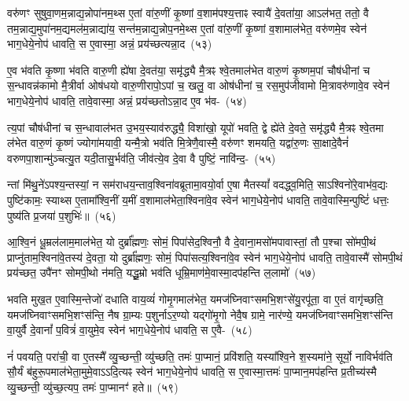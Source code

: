 {\anuvakamend[शृ॒णाति॑ मिथु॒नाना᳚न्नयति यच्छति॥]}

वरु॑णꣳ सुषुवा॒णम॒न्नाद्य॒न्नोपा॑नम॒थ्स ए॒तां वा॑रु॒णीं कृ॒ष्णां व॒शाम॑पश्य॒त्ताꣴ स्वायै॑ दे॒वता॑या॒ आ\-ऽल॑भत॒ ततो॒ वै तम॒न्नाद्य॒मुपा॑नम॒द्यमल॑म॒न्नाद्या॑य॒ सन्त॑म॒न्नाद्य॒न्नोप॒नमे॒थ्स ए॒तां वा॑रु॒णीं कृ॒ष्णां व॒शामा\-ल॑भेत॒ वरु॑णमे॒व स्वेन॑ भाग॒धेये॒नोप॑ धावति॒ स ए॒वास्मा॒ अन्नं॒ प्रय॑च्छत्यन्ना॒द~(५३)

ए॒व भ॑वति कृ॒ष्णा भ॑वति वारु॒णी ह्ये॑षा दे॒वत॑या॒ समृ॑द्ध्यै मै॒त्रꣴ श्वे॒तमाल॑भेत वारु॒णं कृ॒ष्णम॒पां चौष॑धीनां च स॒न्धावन्न॑कामो मै॒त्रीर्वा ओष॑धयो वारु॒णीरापो॒\-ऽपां च॒ खलु॒ वा ओष॑धीनां च॒ रस॒मुप॑जीवामो मि॒त्रावरु॑णावे॒व स्वेन॑ भाग॒धेये॒नोप॑ धावति॒ तावे॒वास्मा॒ अन्नं॒ प्रय॑च्छतो\-ऽन्ना॒द ए॒व भ॑व-~(५४)

त्य॒पां चौष॑धीनां च स॒न्धावाल॑भत उ॒भय॒स्याव॑रुद्ध्यै॒ विशा॑खो॒ यूपो॑ भवति॒ द्वे ह्ये॑ते दे॒वते॒ समृ॑द्ध्यै मै॒त्रꣴ श्वे॒तमा ल॑भेत वारु॒णं कृ॒ष्णं ज्योगा॑मयावी॒ यन्मै॒त्रो भव॑ति मि॒त्रेणै॒वास्मै॒ वरु॑णꣳ शमयति॒ यद्वा॑रु॒णः सा॒क्षादे॒वैनं॑ वरुण\-पा॒शान्मु॑ञ्चत्यु॒त यदी॒तासु॒र्भव॑ति॒ जीव॑त्ये॒व दे॒वा वै पुष्टिं॒ नावि॑न्द॒-~(५५)

न्तां मि॑थु॒ने॑\-ऽपश्य॒न्तस्यां॒ न सम॑राधय॒न्ताव॒श्विना॑\-वब्रूतामा॒वयो॒र्वा ए॒षा मैतस्यां᳚ वदद्ध्व॒मिति॒ सा\-ऽश्विनो॑रे॒वाभ॑व॒द्यः पुष्टि॑कामः॒ स्याथ्स ए॒तामा᳚श्वि॒नीं य॒मीं व॒शामाल॑भेता॒श्विना॑वे॒व स्वेन॑ भाग॒धेये॒नोप॑ धावति॒ तावे॒वास्मि॒न्पुष्टिं॑ धत्तः॒ पुष्य॑ति प्र॒जया॑ प॒शुभिः॑॥~(५६)

{\anuvakamend[{अ॒न्ना॒दो᳚\-ऽन्ना॒द ए॒व भ॑वत्यविन्द॒न्पञ्च॑चत्वारिꣳशच्च}]}

आ॒श्वि॒नं धू॒म्रल॑लाम॒मा\-ल॑भेत॒ यो दुर्ब्रा᳚ह्मणः॒ सोमं॒ पिपा॑सेद॒श्विनौ॒ वै दे॒वाना॒मसो॑मपावास्तां॒ तौ प॒श्चा सो॑मपी॒थं प्राप्नु॑ताम॒श्विना॑वे॒तस्य॑ दे॒वता॒ यो दुर्ब्रा᳚ह्मणः॒ सोमं॒ पिपा॑सत्य॒श्विना॑वे॒व स्वेन॑ भाग॒धेये॒नोप॑ धावति॒ तावे॒वास्मै॑ सोमपी॒थं प्रय॑च्छत॒ उपै॑नꣳ सोमपी॒थो न॑मति॒ यद्धू॒म्रो भव॑ति धूम्रि॒माण॑मे॒वास्मा॒दप॑हन्ति ल॒लामो॑~(५७)

भवति मुख॒त ए॒वास्मि॒न्तेजो॑ दधाति वाय॒व्यं॑ गोमृ॒गमा\-ल॑भेत॒ यमज॑घ्निवाꣳसमभि॒शꣳसे॑यु॒रपू॑ता॒ वा ए॒तं वागृ॑च्छति॒ यमज॑घ्निवाꣳसमभि॒शꣳस॑न्ति॒ नैष ग्रा॒म्यः प॒शुर्ना\-ऽर॒ण्यो यद्गो॑मृ॒गो नेवै॒ष ग्रामे॒ नार॑ण्ये॒ यमज॑घ्निवाꣳसमभि॒शꣳस॑न्ति वा॒युर्वै दे॒वानां᳚ प॒वित्रं॑ वा॒युमे॒व स्वेन॑ भाग॒धेये॒नोप॑ धावति॒ स ए॒वै-~(५८)

नं॑ पवयति॒ परा॑ची॒ वा ए॒तस्मै᳚ व्यु॒च्छन्ती॒ व्यु॑च्छति॒ तमः॑ पा॒प्मानं॒ प्रवि॑शति॒ यस्या᳚श्वि॒ने श॒स्यमा॑ने॒ सूर्यो॒ नाविर्भव॑ति सौ॒र्यं ब॑हुरू॒पमाल॑भेता॒मुमे॒वा\-ऽऽ\-दि॒त्यꣴ स्वेन॑ भाग॒धेये॒नोप॑ धावति॒ स ए॒वास्मा॒त्तमः॑ पा॒प्मान॒मप॑हन्ति प्र॒तीच्य॑स्मै व्यु॒च्छन्ती॒ व्यु॑च्छ॒त्यप॒ तमः॑ पा॒प्मानꣳ॑ हते॥~(५९)

